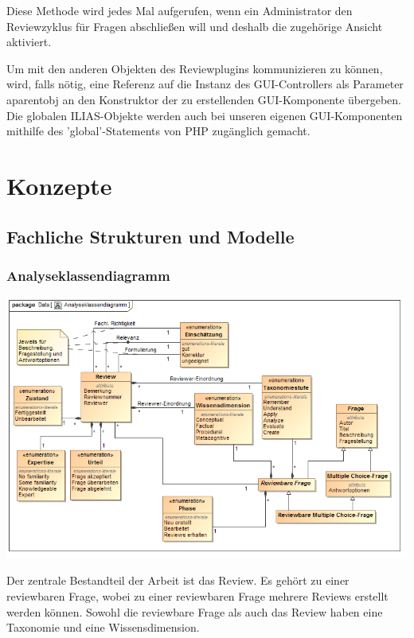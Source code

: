 \documentclass[a4paper]{scrreprt}
\begin{document}
Diese Methode wird jedes Mal aufgerufen, wenn ein Administrator den Reviewzyklus für Fragen abschließen will und deshalb die zugehörige Ansicht aktiviert. 

Um mit den anderen Objekten des Reviewplugins kommunizieren zu können, wird, falls nötig, eine Referenz auf die Instanz des GUI-Controllers als Parameter a\textunderscore parent\textunderscore obj an den Konstruktor der zu erstellenden GUI-Komponente übergeben. 
Die globalen ILIAS-Objekte werden auch bei unseren eigenen GUI-Komponenten mithilfe des 'global'-Statements von PHP zugänglich gemacht.

\chapter{Konzepte}

\section{Fachliche Strukturen und Modelle}

\subsection{Analyseklassendiagramm}

\includegraphics[width=1.0\textwidth]{Class_Diagram__Analyseklassendiagramm.png}
\label{Analyseklassendiagramm}

Der zentrale Bestandteil der Arbeit ist das Review. 
Es gehört zu einer reviewbaren Frage, wobei zu einer reviewbaren Frage mehrere Reviews erstellt werden können.
Sowohl die reviewbare Frage als auch das Review haben eine Taxonomie und eine Wissensdimension.
\end{document}
